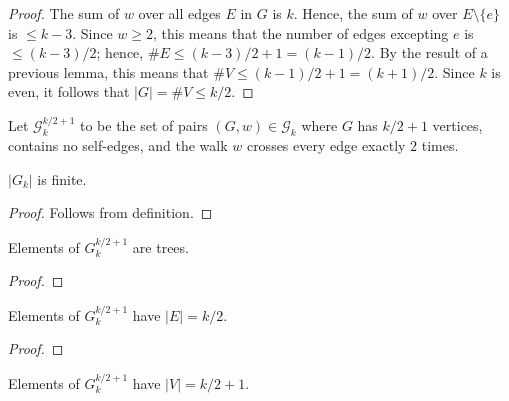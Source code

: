 \begin{proof}
  \notready
  The sum of $w$ over all edges $E$ in $G$ is $k$.  Hence, the sum of $w$ over $E\setminus\{e\}$ is $\le k-3$.  Since $w\ge 2$, this means that the number of edges excepting $e$ is $\le (k-3)/2$; hence, $\#E \le (k-3)/2+1 = (k-1)/2$.  By the result of a previous lemma, this means that $\#V \le (k-1)/2+1 = (k+1)/2$.  Since $k$ is even, it follows that $|G|=\#V \le k/2$.
\end{proof}




\begin{definition}
  \label{def:special_set_g}
  \notready
  Let $\mathcal{G}^{k/2+1}_k$ to be the set of pairs $(G,w)\in\mathcal{G}_k$ where $G$ has $k/2+1$ vertices, contains no self-edges, and the walk $w$ crosses every edge exactly $2$ times.
\end{definition}


\begin{lemma}
  \label{lemma:graph_set_finite}
  \notready
  $|G_k|$ is finite.
\end{lemma}

\begin{proof}
  \notready
  Follows from definition.
\end{proof}


\begin{lemma}
  \label{lemma:special_g_tree}
  \notready
  Elements of $G_k^{k/2+1}$ are trees.
\end{lemma}

\begin{proof}
  \notready
\end{proof}

\begin{lemma}
  \label{lemma:special_g_edge_count}
  \notready
  Elements of $G_k^{k/2+1}$ have $|E| = k/2$.
\end{lemma}

\begin{proof}
  \notready
\end{proof}

\iffalse
\begin{lemma}
  \label{lemma:special_g_vertex_count}
  \notready
  Elements of $G_k^{k/2+1}$ have $|V| = k/2 + 1$.
\end{lemma}

